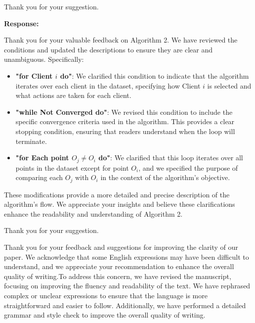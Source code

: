 \documentclass[a4paper,twoside,11pt,dvipsnames]{reviewresponse}
\begin{document}

Thank you for your suggestion.


\textbf{Response:}

Thank you for your valuable feedback on Algorithm 2. We have reviewed the conditions and updated the descriptions to ensure they are clear and unambiguous. Specifically:

\begin{itemize}
    \item \textbf{"for Client $i$ do"}: We clarified this condition to indicate that the algorithm iterates over each client in the dataset, specifying how Client $i$ is selected and what actions are taken for each client.

    \item \textbf{"while Not Converged do"}: We revised this condition to include the specific convergence criteria used in the algorithm. This provides a clear stopping condition, ensuring that readers understand when the loop will terminate.

    \item \textbf{"for Each point $O_j \neq O_i$ do"}: We clarified that this loop iterates over all points in the dataset except for point $O_i$, and we specified the purpose of comparing each $O_j$ with $O_i$ in the context of the algorithm’s objective.
\end{itemize}

These modifications provide a more detailed and precise description of the algorithm’s flow. We appreciate your insights and believe these clarifications enhance the readability and understanding of Algorithm 2.



Thank you for your suggestion.

Thank you for your feedback and suggestions for improving the clarity of our paper. We acknowledge that some English expressions may have been difficult to understand, and we appreciate your recommendation to enhance the overall quality of writing.To address this concern, we have revised the manuscript, focusing on improving the fluency and readability of the text. We have rephrased complex or unclear expressions to ensure that the language is more straightforward and easier to follow. Additionally, we have performed a detailed grammar and style check to improve the overall quality of writing.
\end{document}
